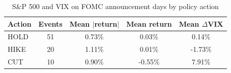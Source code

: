 \begin{table}[H]
\centering
\caption{S\&P 500 and VIX on FOMC announcement days by policy action}
\begin{tabular}{lcccc}
\toprule
Action & Events & Mean $|$return$|$ & Mean return & Mean $\Delta$VIX \\
\midrule
HOLD & 51 & 0.73\% & 0.03\% & 0.14\% \\
HIKE & 20 & 1.11\% & 0.01\% & -1.73\% \\
CUT & 10 & 0.90\% & -0.55\% & 7.91\% \\
\bottomrule
\end{tabular}
\end{table}
